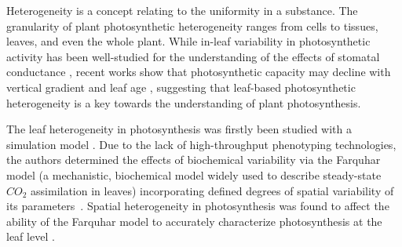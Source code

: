 \documentclass{bioinfo}
\begin{document}



Heterogeneity is a concept relating to the uniformity in a substance. The granularity of plant photosynthetic heterogeneity ranges from cells to tissues, leaves, and even the whole plant. While in-leaf variability in photosynthetic activity has been well-studied for the understanding of the effects of stomatal conductance \citep{Cheeseman1991,Buckley1997}, recent works show that photosynthetic capacity may decline with vertical gradient and leaf age \citep{Kitajima2002,chen2008effect}, suggesting that leaf-based photosynthetic heterogeneity is a key towards the understanding of plant photosynthesis.

The leaf heterogeneity in photosynthesis was firstly been studied  with a simulation model \citep{chen2008effect}. Due to the lack of high-throughput phenotyping technologies, the authors determined the effects of biochemical variability via the Farquhar model (a mechanistic, biochemical model widely used to describe steady-state $CO_2$ assimilation in leaves) incorporating defined degrees of spatial variability of its parameters~\citep{sharkey1985o2,farquhar2001models}. Spatial heterogeneity in photosynthesis was found to affect the ability of the Farquhar model to accurately characterize photosynthesis at the leaf level \citep{chen2008effect}.
\end{document}
